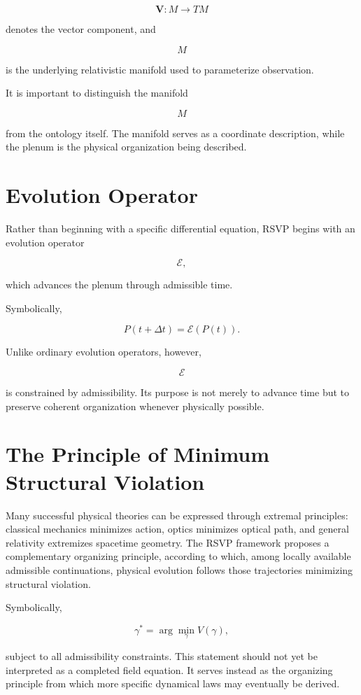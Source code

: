\documentclass[11pt,oneside]{book}
\numberwithin{equation}{chapter}
\theoremstyle{definition}
\theoremstyle{plain}
\begin{document}
\[
\mathbf{V} : M \rightarrow TM
\]

denotes the vector component, and

\[
M
\]

is the underlying relativistic manifold used to parameterize observation.

It is important to distinguish the manifold

\[
M
\]

from the ontology itself. The manifold serves as a coordinate description, while the plenum is the physical organization being described.

\section{Evolution Operator}

Rather than beginning with a specific differential equation, RSVP begins
with an evolution operator

\[
\mathcal{E},
\]

which advances the plenum through admissible time.

Symbolically,

\[
P(t+\Delta t)
=
\mathcal{E}
\left(
P(t)
\right).
\]

Unlike ordinary evolution operators, however,

\[
\mathcal{E}
\]

is constrained by admissibility. Its purpose is not merely to advance time but to preserve coherent organization whenever physically possible.

\section{The Principle of Minimum Structural Violation}

Many successful physical theories can be expressed through extremal principles: classical mechanics minimizes action, optics minimizes optical path, and general relativity extremizes spacetime geometry. The RSVP framework proposes a complementary organizing principle, according to which, among locally available admissible continuations, physical evolution follows those trajectories minimizing structural violation.

Symbolically,

\[
\gamma^{*}
=
\arg\min_{\gamma}
V(\gamma),
\]

subject to all admissibility constraints. This statement should not yet be interpreted as a completed field equation. It serves instead as the organizing principle from which more specific dynamical laws may eventually be derived.
\end{document}
